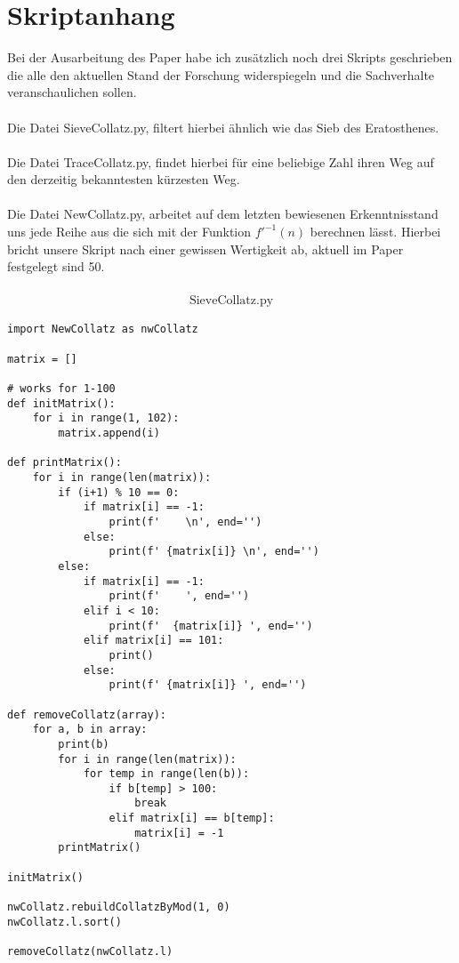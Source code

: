 \documentclass{article}
\begin{document}
\section{Skriptanhang}
Bei der Ausarbeitung des Paper habe ich zusätzlich noch drei Skripts geschrieben die alle den aktuellen Stand der Forschung widerspiegeln und die Sachverhalte veranschaulichen sollen.\\\\
Die Datei SieveCollatz.py, filtert hierbei ähnlich wie das Sieb des Eratosthenes. \\\\
Die Datei TraceCollatz.py, findet hierbei für eine beliebige Zahl ihren Weg auf den derzeitig bekanntesten kürzesten Weg.\\\\
Die Datei NewCollatz.py, arbeitet auf dem letzten bewiesenen Erkenntnisstand uns jede Reihe aus die sich mit der Funktion $f'^{-1}(n)$ berechnen lässt. Hierbei bricht unsere Skript nach einer gewissen Wertigkeit ab, aktuell im Paper festgelegt sind 50. \\\\

\newpage
\begin{gather*}
\text {SieveCollatz.py}
\end{gather*}
\begin{verbatim}
import NewCollatz as nwCollatz

matrix = []

# works for 1-100
def initMatrix():
    for i in range(1, 102):
        matrix.append(i)

def printMatrix():
    for i in range(len(matrix)):
        if (i+1) % 10 == 0:
            if matrix[i] == -1:
                print(f'    \n', end='')
            else:
                print(f' {matrix[i]} \n', end='')
        else:
            if matrix[i] == -1:
                print(f'    ', end='')
            elif i < 10:
                print(f'  {matrix[i]} ', end='')
            elif matrix[i] == 101:
                print()
            else:
                print(f' {matrix[i]} ', end='')

def removeCollatz(array):
    for a, b in array:
        print(b)
        for i in range(len(matrix)):
            for temp in range(len(b)):
                if b[temp] > 100:
                    break
                elif matrix[i] == b[temp]:
                    matrix[i] = -1
        printMatrix()

initMatrix()

nwCollatz.rebuildCollatzByMod(1, 0)
nwCollatz.l.sort()

removeCollatz(nwCollatz.l)
\end{verbatim}
\end{document}
